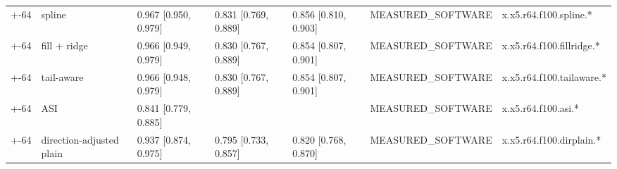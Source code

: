 \begin{table}[t]
\begin{tabular}{lllllll}
+-64 & spline & 0.967 [0.950, 0.979] & 0.831 [0.769, 0.889] & 0.856 [0.810, 0.903] & MEASURED\_SOFTWARE & x.x5.r64.f100.spline.* \\
+-64 & fill + ridge & 0.966 [0.949, 0.979] & 0.830 [0.767, 0.889] & 0.854 [0.807, 0.901] & MEASURED\_SOFTWARE & x.x5.r64.f100.fillridge.* \\
+-64 & tail-aware & 0.966 [0.948, 0.979] & 0.830 [0.767, 0.889] & 0.854 [0.807, 0.901] & MEASURED\_SOFTWARE & x.x5.r64.f100.tailaware.* \\
+-64 & ASI & 0.841 [0.779, 0.885] &  &  & MEASURED\_SOFTWARE & x.x5.r64.f100.asi.* \\
+-64 & direction-adjusted plain & 0.937 [0.874, 0.975] & 0.795 [0.733, 0.857] & 0.820 [0.768, 0.870] & MEASURED\_SOFTWARE & x.x5.r64.f100.dirplain.* \\
\bottomrule
\end{tabular}
\end{table}
